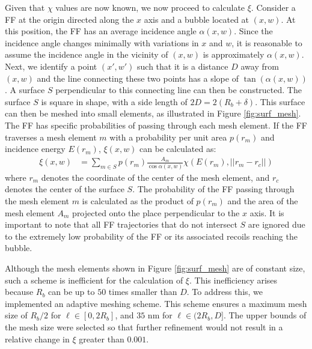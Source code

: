 \documentclass[review]{elsarticle}
\begin{document}
Given that $\chi$ values are now known, we now proceed to calculate $\xi$.
Consider a FF at the origin directed along the $x$ axis
and a bubble located at $(x, w)$.
At this position, the FF has an average incidence angle $\alpha(x, w)$.
Since the incidence angle changes minimally with variations in $x$ and $w$,
it is reasonable to assume the incidence angle
in the vicinity of $(x, w)$ is approximately $\alpha(x, w)$.
Next, we identify a point $(x', w')$ such that
it is a distance $D$ away from $(x, w)$
and the line connecting these two points has a slope of $\tan (\alpha(x, w))$.
A surface $S$ perpendicular to this connecting line can then be constructed.
The surface $S$ is square in shape,
with a side length of $2D = 2(R_b + \delta)$.
This surface can then be meshed into small elements,
as illustrated in Figure \ref{fig:surf_mesh}.
The FF has specific probabilities of passing through each mesh element.
If the FF traverses a mesh element $m$
with a probability per unit area $p(r_m)$ and incidence energy $E(r_m)$,
$\xi(x, w)$ can be calculated as:
\begin{align}
	\xi(x, w) &= \sum_{m \in S}
		p(r_m) \frac{A_m}{\cos \alpha(x, w)}
		\chi(E(r_m), ||r_m - r_c||)
	\label{eq:mesh}
\end{align}
where $r_m$ denotes the coordinate of the center of the mesh element,
and $r_c$ denotes the center of the surface $S$.
The probability of the FF passing through the mesh element $m$ is calculated
as the product of $p(r_m)$ and the area of the mesh element $A_m$
projected onto the place perpendicular to the $x$ axis.
It is important to note that all FF trajectories
that do not intersect $S$ are ignored
due to the extremely low probability of the FF or its associated recoils
reaching the bubble.

Although the mesh elements shown in Figure \ref{fig:surf_mesh}
are of constant size,
such a scheme is inefficient for the calculation of $\xi$.
This inefficiency arises because
$R_b$ can be up to $50$ times smaller than $D$.
To address this, we implemented an adaptive meshing scheme.
This scheme ensures
a maximum mesh size of $R_b / 2$ for $\ell \in [0, 2 R_b]$,
and $35$ nm for $\ell \in (2 R_b, D]$.
The upper bounds of the mesh size were selected
so that further refinement would not result in
a relative change in $\xi$ greater than $0.001$.
\end{document}
